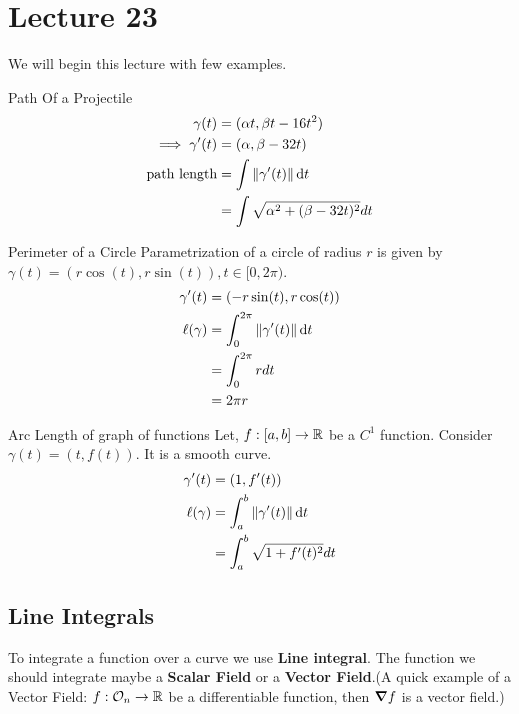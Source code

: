 \documentclass[../Analysis-3]{subfiles}
\begin{document}
\chapter*{Lecture 23} %
\setcounter{chapter}{23} %
\setcounter{section}{0}

We will begin this lecture with few examples.
\begin{Eg}{Path Of a Projectile}{}
    \begin{align*}
        \gamma(t)           & =(\alpha t, \beta t-16t^2)               \\
        \implies \gamma'(t) & = (\alpha, \beta -32t)                   \\
        \text{path length}  & = \int \norm{\gamma'(t)}\dd{t}           \\
                            & = \int \sqrt{\alpha^2 +(\beta-32t)^2} dt
    \end{align*}
\end{Eg}

\begin{Eg}{Perimeter of a Circle}{}
    Parametrization of a circle of radius $r$ is given by $\gamma(t) = (r\cos(t),r\sin(t)), t \in [0,2\pi)$.
    \begin{align*}
        \gamma'(t)    & = (-r\sin(t),r\cos(t))                    \\
        \ell (\gamma) & = \int_{0}^{2\pi} \norm{\gamma'(t)}\dd{t} \\
                      & = \int_{0}^{2\pi} r dt                    \\
                      & = 2\pi r
    \end{align*}
\end{Eg}

\begin{Eg}{Arc Length of graph of functions}{}
    Let, $f : [a,b]\to \mathbb{R}$ be a $C^1$ function. Consider $\gamma(t)=(t, f(t))$. It is a smooth curve.
    \begin{align*}
        \gamma'(t)    & = (1,f'(t))                            \\
        \ell (\gamma) & = \int_{a}^{b} \norm{\gamma'(t)}\dd{t} \\
                      & = \int_{a}^{b} \sqrt{1 + f'(t)^2} dt
    \end{align*}
\end{Eg}

\section{Line Integrals}
To integrate a function over a curve we use \textbf{Line integral}. The function we should integrate maybe a \textbf{Scalar Field} or a \textbf{Vector Field}.(A quick example of a Vector Field: $f : \mathcal{O}_{n} \to \mathbb{R}$ be a differentiable function, then $\grad f$ is a vector field.)
\end{document}
